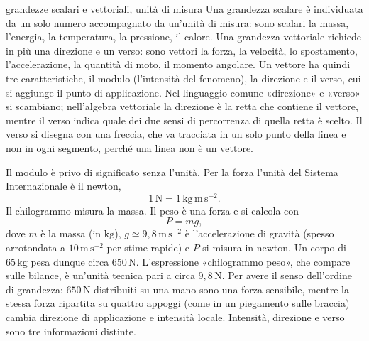 \documentclass[11pt,a4paper]{article}
\newcommand{\un}[1]{\,\mathrm{#1}}
\begin{document}
\begin{richiamo}{grandezze scalari e vettoriali, unità di misura}
Una grandezza scalare è individuata da un solo numero accompagnato da un'unità di misura: sono scalari la massa, l'energia, la temperatura, la pressione, il calore. Una grandezza vettoriale richiede in più una direzione e un verso: sono vettori la forza, la velocità, lo spostamento, l'accelerazione, la quantità di moto, il momento angolare. Un vettore ha quindi tre caratteristiche, il modulo (l'intensità del fenomeno), la direzione e il verso, cui si aggiunge il punto di applicazione. Nel linguaggio comune «direzione» e «verso» si scambiano; nell'algebra vettoriale la direzione è la retta che contiene il vettore, mentre il verso indica quale dei due sensi di percorrenza di quella retta è scelto. Il verso si disegna con una freccia, che va tracciata in un solo punto della linea e non in ogni segmento, perché una linea non è un vettore.

Il modulo è privo di significato senza l'unità. Per la forza l'unità del Sistema Internazionale è il newton,
\[
1\un{N}=1\un{kg\,m\,s^{-2}} .
\]
Il chilogrammo misura la massa. Il peso è una forza e si calcola con
\[
P=mg ,
\]
dove $m$ è la massa (in $\mathrm{kg}$), $g\simeq 9{,}8\un{m\,s^{-2}}$ è l'accelerazione di gravità (spesso arrotondata a $10\un{m\,s^{-2}}$ per stime rapide) e $P$ si misura in newton. Un corpo di $65\un{kg}$ pesa dunque circa $650\un{N}$. L'espressione «chilogrammo peso», che compare sulle bilance, è un'unità tecnica pari a circa $9{,}8\un{N}$. Per avere il senso dell'ordine di grandezza: $650\un{N}$ distribuiti su una mano sono una forza sensibile, mentre la stessa forza ripartita su quattro appoggi (come in un piegamento sulle braccia) cambia direzione di applicazione e intensità locale. Intensità, direzione e verso sono tre informazioni distinte.
\end{richiamo}
\end{document}
